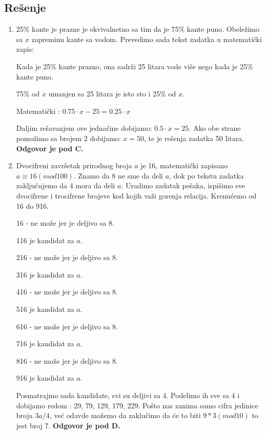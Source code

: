 \documentclass[a4paper,12pt]{report}
\begin{document}

\newpage

\subsection*{Re\v{s}enje}
\begin{enumerate}[1.]

\item 25\% kante je prazne je ekvivalnetno sa tim da je 75\% kante puno. Obele\v{z}imo sa $x$ zapreminu kante sa vodom. Prevedimo sada tekst zadatka u matemati\v{c}ki zapis:
\par Kada je 25\% kante prazno, ona sadr\v{z}i 25 litara vode vi\v{s}e nego kada je 25\% kante puno.
\par 75\% od $x$ umanjen sa 25 litara je isto sto i 25\% od $x$.
\par Matemati\v{c}ki : $ 0.75 \cdot x - 25 = 0.25 \cdot x$
\par Daljim re\v{s}avanjem ove jedna\v{c}ine dobijamo: $ 0.5 \cdot x = 25$. Ako obe strane pomo\v{z}imo sa brojem 2 dobijamo: $x = 50$, te je re\v{s}enja zadatka 50 litara. \textbf{Odgovor je pod C.}

\item Dvocifreni zavr\v{s}etak prirodnog broja $a$ je 16, matemati\v{c}ki zapisano $ a \equiv 16 (mod 100)$. Znamo da 8 ne sme da deli $a$, dok po tekstu zadatka zaklju\v{c}ujemo da 4 mora da deli $a$. Uradimo zadatak pe\v{s}aka, ispi\v{s}imo sve dvocifrene i trocifrene brojeve kod kojih va\v{z}i gorenja relacija. Krenu\'{c}emo od 16 do 916.
\par 16 - ne mo\v{z}e jer je deljivo sa 8.
\par 116 je kandidat za $a$.
\par 216 - ne mo\v{z}e jer je deljivo sa 8.
\par 316 je kandidat za $a$.
\par 416 - ne mo\v{z}e jer je deljivo sa 8.
\par 516 je kandidat za $a$.
\par 616 - ne mo\v{z}e jer je deljivo sa 8.
\par 716 je kandidat za $a$.
\par 816 - ne mo\v{z}e jer je deljivo sa 8.
\par 916 je kandidat za $a$.
\par Posmatrajmo sada kandidate, svi su deljivi sa 4. Podelimo ih sve sa 4 i dobijamo redom : 29, 79, 129, 179, 229. Po\v{s}to nas zanima samo cifra jedinice broja $3a/4$, ve\'{c} odavde mo\v{z}emo da zaklu\v{c}imo da \'{c}e to biti $9 * 3 (mod 10)$ to jest broj 7. \textbf{Odgovor je pod D.}


\end{enumerate}
\end{document}
